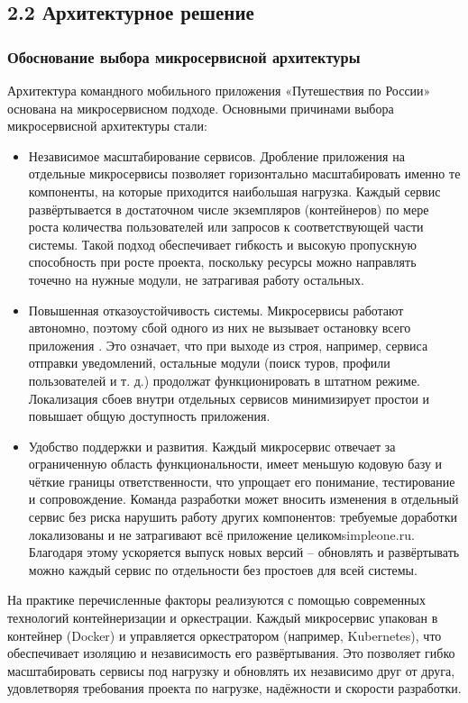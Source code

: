 \subsection*{2.2 Архитектурное решение}

\subsubsection*{Обоснование выбора микросервисной архитектуры}
Архитектура командного мобильного приложения «Путешествия по России» основана на микросервисном подходе. Основными причинами выбора микросервисной архитектуры стали:
\begin{itemize}
    \item Независимое масштабирование сервисов. Дробление приложения на отдельные микросервисы позволяет горизонтально масштабировать именно те компоненты, на которые приходится наибольшая нагрузка. Каждый сервис развёртывается в достаточном числе экземпляров (контейнеров) по мере роста количества пользователей или запросов к соответствующей части системы. Такой подход обеспечивает гибкость и высокую пропускную способность при росте проекта, поскольку ресурсы можно направлять точечно на нужные модули, не затрагивая работу остальных.
    \item Повышенная отказоустойчивость системы. Микросервисы работают автономно, поэтому сбой одного из них не вызывает остановку всего приложения \cite{6}. Это означает, что при выходе из строя, например, сервиса отправки уведомлений, остальные модули (поиск туров, профили пользователей и т. д.) продолжат функционировать в штатном режиме. Локализация сбоев внутри отдельных сервисов минимизирует простои и повышает общую доступность приложения.
    \item Удобство поддержки и развития. Каждый микросервис отвечает за ограниченную область функциональности, имеет меньшую кодовую базу и чёткие границы ответственности, что упрощает его понимание, тестирование и сопровождение. Команда разработки может вносить изменения в отдельный сервис без риска нарушить работу других компонентов: требуемые доработки локализованы и не затрагивают всё приложение целикомsimpleone.ru. Благодаря этому ускоряется выпуск новых версий – обновлять и развёртывать можно каждый сервис по отдельности без простоев для всей системы.
\end{itemize}
На практике перечисленные факторы реализуются с помощью современных технологий контейнеризации и оркестрации. Каждый микросервис упакован в контейнер (Docker) и управляется оркестратором (например, Kubernetes), что обеспечивает изоляцию и независимость его развёртывания. Это позволяет гибко масштабировать сервисы под нагрузку и обновлять их независимо друг от друга, удовлетворяя требования проекта по нагрузке, надёжности и скорости разработки.

